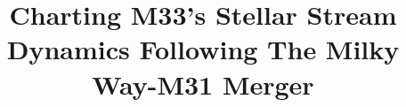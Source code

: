 \documentclass[linenumbers,trackchanges]{aastex7}
\begin{document}
\title{Charting M33's Stellar Stream Dynamics Following The Milky Way-M31 Merger}

\end{document}
